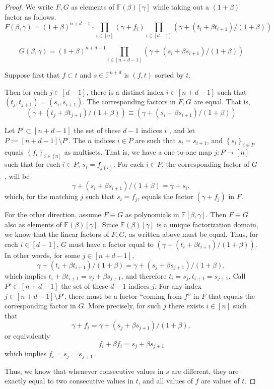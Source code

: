 \documentclass[11pt]{article} %
\newcommand{\F}{\ensuremath{\mathbb F}\xspace}
\newcommand{\defeq}{:=}
\newcommand{\sett}[2]{\ensuremath{\set{#1}_{#2}}\xspace}
\newcommand{\set}[1]{\ensuremath{\left\{#1\right\}}\xspace}
\begin{document}
\begin{proof}
 We write $F,G$ as elements of $\F(\beta)[\gamma]$ while taking out a $(1+\beta)$ factor as follows.
\[F(\beta,\gamma) = (1+\beta)^{n+d-1}\cdot \prod_{i\in [n]} (\gamma + f_i) \prod_{i\in [d-1]} \left(\gamma + (t_i + \beta t_{i+1})/(1+\beta)\right)\]
                                  
\[G(\beta,\gamma)  = (1+\beta)^{n+d-1} \prod_{i\in [n+d-1]} \left( \gamma+ (s_i + \beta s_{i+1})/(1+\beta) \right)\]
 
 
 Suppose first that $f\subset t$ and $s\in \F^{n+d}$ is $(f,t)$ sorted by $t$.

 Then for each $j\in [d-1]$, there is a distinct index $i\in [n+d-1]$ such that
 $ (t_j,t_{j+1})=(s_i,s_{i+1})$.
 The corresponding factors in $F,G$ are equal. That is,
 \[(\gamma + (t_j + \beta t_{j+1})/(1+\beta)) \equiv (\gamma + (s_i + \beta s_{i+1})/(1+\beta))\]

 Let $P'\subset [n+d-1]$ the set of these $d-1$ indices $i$
 , and let $P\defeq [n+d-1]\setminus P'$.
 The $n$ indices $i\in P$ are such 
 that $s_i=s_{i+1}$, and  $\sett{s_i}{i\in P}$ equals $\sett{f_i}{i\in [n]}$ as multisets.
 That is, we have a one-to-one map $j:P\to [n]$ such that for each $i\in P$, $s_i = f_{j(i)}$.
 For each $i\in P$, the corresponding factor of $G$, will be
 \[ \gamma + (s_i + \beta s_{i+1})/(1+\beta)= \gamma + s_i,\]
 which, for the matching $j$ such that $s_i =f_j$, equals the factor $(\gamma + f_j)$ in $F$.
 
 
 For the other direction, assume $F\equiv G$ as polynomials in $\F[\beta,\gamma]$.  
 Then $F\equiv G$ also as elements of $\F(\beta)[\gamma]$.
 Since $\F(\beta)[\gamma]$ is a unique factorization domain, we know that the linear factors of $F,G$, as written above must be equal.
 Thus, for each $i\in [d-1]$, $G$ must have a factor equal to $(\gamma + (t_i + \beta t_{i+1})/(1+\beta))$.
 In other words, for some $j\in [n+d-1]$, 
 \[\gamma + (t_i + \beta t_{i+1})/(1+\beta)= \gamma+ (s_j + \beta s_{j+1})/(1+\beta),\]
 which implies $t_i + \beta t_{i+1}= s_j + \beta s_{j+1}$, and therefore $t_i= s_j, t_{i+1}=s_{j+1}$.
Call $P'\subset [n+d-1]$ the set of these $d-1$ indices $j$.
 For any index $j\in [n+d-1]\setminus P'$, there must be a factor ``coming from $f$'' in $F$ that equals the corresponding factor in $G$. More precisely, for such $j$ there exists $i\in [n]$ such that
 \[\gamma + f_i = \gamma+ (s_j + \beta s_{j+1})/(1+\beta),\]
 or equivalently
 \[f_i+ \beta f_i = s_j + \beta s_{j+1}\]
 which implies
 $f_i= s_j=s_{j+1}$.
 
 Thus, we know that whenever consecutive values in $s$ are different, they are exactly equal to two consecutive values in $t$, and all values of $f$ are values of $t$.
 
 \end{proof}
 
\end{document}
